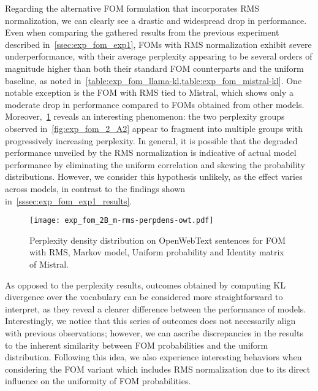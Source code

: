 Regarding the alternative FOM formulation that incorporates RMS normalization, we can clearly see a drastic and widespread drop in performance.
Even when comparing the gathered results from the previous experiment described in~\cref{ssec:exp_fom_exp1}, FOMs with RMS normalization exhibit severe underperformance, with their average perplexity appearing to be several orders of magnitude higher than both their standard FOM counterparts and the uniform baseline, as noted in~\cref{table:exp_fom_llama-kl,table:exp_fom_mistral-kl}.
One notable exception is the FOM with RMS tied to Mistral, which shows only a moderate drop in performance compared to FOMs obtained from other models.
Moreover,~\cref{fig:exp_fom_2_B} reveals an interesting phenomenon: the two perplexity groups observed in~\cref{fig:exp_fom_2_A2} appear to fragment into multiple groups with progressively increasing perplexity.
In general, it is possible that the degraded performance unveiled by the RMS normalization is indicative of actual model performance by eliminating the uniform correlation and skewing the probability distributions.
However, we consider this hypothesis unlikely, as the effect varies across models, in contrast to the findings shown in~\cref{sssec:exp_fom_exp1_results}.

\begin{figure}[t!]
    \centering
    \texttt{[image: exp\_fom\_2B\_m-rms-perpdens-owt.pdf]}
    \caption{Perplexity density distribution on OpenWebText sentences for FOM with RMS, Markov model, Uniform probability and Identity matrix of Mistral.}
    \label{fig:exp_fom_2_B}
\end{figure}

As opposed to the perplexity results, outcomes obtained by computing KL divergence over the vocabulary can be considered more straightforward to interpret, as they reveal a clearer difference between the performance of models.
Interestingly, we notice that this series of outcomes does not necessarily align with previous observations; however, we can ascribe discrepancies in the results to the inherent similarity between FOM probabilities and the uniform distribution.
Following this idea, we also experience interesting behaviors when considering the FOM variant which includes RMS normalization due to its direct influence on the uniformity of FOM probabilities.

